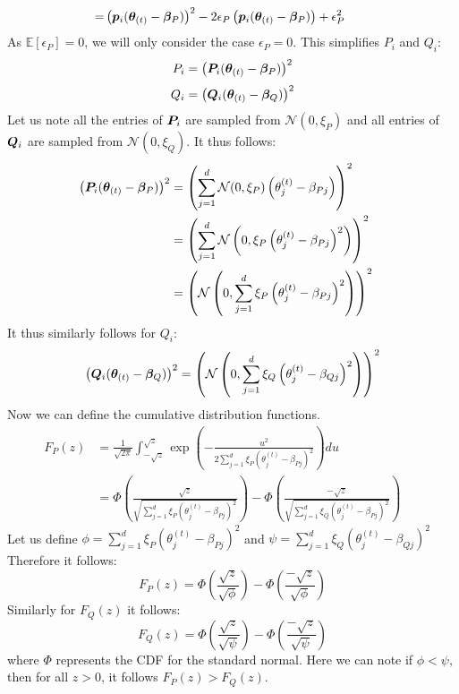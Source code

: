 \documentclass{article} %
\begin{document}
\begin{appendices}
\begin{align}
		= &\left({\bm{p}}_i({\bm{\theta}}_{(t)} - {\bm{\beta}}_P)\right)^2 - 2 {\epsilon}_P \left({\bm{p}}_i({\bm{\theta}}_{(t)} - {\bm{\beta}}_P)\right) + {\epsilon}_P^2 &&
	\end{align}
	As $\mathbb{E}\left[\epsilon_P\right] = 0$, we will only consider the case $\epsilon_P = 0$. This simplifies $P_i$ and $Q_i$:
	\begin{equation}
		P_i = \left({\bm{P}}_i({\bm{\theta}}_{(t)} - {\bm{\beta}}_P)\right)^2 
	\end{equation}
	\begin{equation}
		Q_i = \left({\bm{Q}}_i({\bm{\theta}}_{(t)} - {\bm{\beta}}_Q)\right)^2
	\end{equation}
	Let us note all the entries of ${\bm{P}}_i$ are sampled from $\mathcal{N}(0,\xi_P)$ and all entries of ${\bm{Q}}_i$ are sampled from $\mathcal{N}(0,\xi_Q)$.
	It thus follows:
	\begin{align*}
		\left({\bm{P}}_i({\bm{\theta}}_{(t)} - {\bm{\beta}}_P)\right)^2 &= \left(\sum_{j=1}^d\mathcal{N}(0,\xi_P)\left(\theta^{(t)}_j - \beta_{Pj}\right)\right)^2 &&\\
		&= \left(\sum_{j=1}^d \mathcal{N}\left(0,\xi_P\left(\theta_j^{(t)} - \beta_{Pj}\right)^2\right)\right)^2  &&\\
		&= \left(\mathcal{N}\left(0, \sum_{j=1}^d \xi_P\left(\theta_j^{(t)} - \beta_{Pj}\right)^2\right)\right)^2
	\end{align*}
	It thus similarly follows for $Q_i$:
	\begin{equation*}
		\left({\bm{Q}}_i({\bm{\theta}}_{(t)} - {\bm{\beta}}_Q)\right)^2 = \left(\mathcal{N}\left(0, \sum_{j=1}^d \xi_Q\left(\theta_j^{(t)} - \beta_{Qj}\right)^2\right)\right)^2
	\end{equation*}
	Now we can define the cumulative distribution functions.
	\begin{align}
		F_P(z) &= \frac{1}{\sqrt{2\pi}}\int_{-\sqrt{z}}^{\sqrt{z}}\exp\left(-\frac{u^2}{2\sum_{j=1}^d \xi_P\left(\theta_j^{(t)} - \beta_{Pj}\right)^2}\right)du &&\\
		&= \Phi\left(\frac{\sqrt{z}}{\sqrt{\sum_{j=1}^d \xi_P\left(\theta_j^{(t)}-\beta_{Pj}\right)^2}}\right) - \Phi\left(\frac{-\sqrt{z}}{\sqrt{\sum_{j=1}^d \xi_Q\left(\theta_j^{(t)}-\beta_{Pj}\right)^2}}\right) &&
	\end{align}
	Let us define $\displaystyle \phi = \sum_{j=1}^d \xi_P\left(\theta_j^{(t)} - \beta_{Pj}\right)^2$ and $\displaystyle \psi = \sum_{j=1}^d \xi_Q\left(\theta_j^{(t)} - \beta_{Qj}\right)^2$
	Therefore it follows:
	\begin{equation}
		F_P(z) = \Phi\left(\frac{\sqrt{z}}{\sqrt{\phi}}\right) - \Phi\left(\frac{-\sqrt{z}}{\sqrt{\phi}}\right)
	\end{equation}
	Similarly for $F_Q(z)$ it follows:
	\begin{equation}
		F_Q(z) = \Phi\left(\frac{\sqrt{z}}{\sqrt{\psi}}\right) - \Phi\left(\frac{-\sqrt{z}}{\sqrt{\psi}}\right)
	\end{equation}
	where $\Phi$ represents the CDF for the standard normal.
	Here we can note if $\phi < \psi$, then for all $z > 0$, it follows $F_P(z) > F_Q(z)$.
	

\end{appendices}
\end{document}

